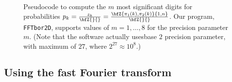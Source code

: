 \begin{figure}[!h]
\begin{small}
\end{small}
\caption{\small
Pseudocode to compute the $m$ most significant digits
for probabilities
$p_k = \frac{z_{k}}{\bfZ{}{}}=\frac{\bfZ{\pi_1(k),\pi_2(k)}{1,n}}{\bfZ{}{}}$.
Our program, {\tt FFTbor2D}, supports values of $m = 1,\ldots,8$ for the
precision parameter $m$.
(Note that the software actually usesbase $2$ precision parameter, with maximum of $27$, where $2^{27} \approx
10^8$.)
}
\label{pseudocode:interpolatingP}
\end{figure}


\subsection{Using the fast Fourier transform}
\label{section:FFT}

